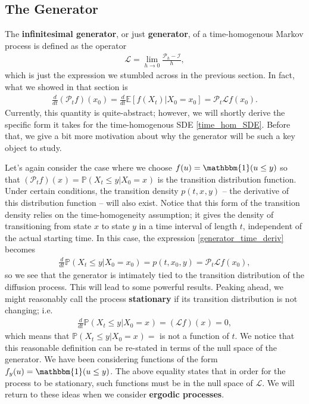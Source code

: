 \documentclass[12pt]{article}
\newcommand{\E}{\mathbb{E}}
\newcommand{\Prob}{\mathbb{P}}
\newcommand{\state}[1][t]{X_{#1}}
\newcommand{\stateValue}[1][t]{x_{#1}}
\newcommand{\op}[1][t]{\mathcal{P}_{#1}} %
\newcommand{\opId}{\mathcal{I}} %
\newcommand{\gen}{\mathcal{L}} %
\begin{document}
\subsection{The Generator}
The \textbf{infinitesimal generator}, or just \textbf{generator}, of a time-homogenous Markov process is defined as the operator
\begin{align}
\gen = \lim_{h \to 0} \frac{\op[h] - \opId}{h},
\end{align}
which is just the expression we stumbled across in the previous section. In fact, what we showed in that section is 
\begin{align}
\frac{d}{dt} (\op f)(\stateValue[0]) = \frac{d}{dt} \E[f(\state) | \state[0] = \stateValue[0]] = \op \gen f(\stateValue[0]). \label{generator_time_deriv}
\end{align}
Currently, this quantity is quite-abstract; however, we will shortly derive the specific form it takes for the time-homogenous SDE \ref{time_hom_SDE}. Before that, 
we give a bit more motivation about why the generator will be such a key object to study. 

Let's again consider the case where we choose $f(u) = \mathbbm{1}(u \leq y)$ so that $(\op f)(\stateValue[]) = \Prob(\state \leq y | \state[0] = \stateValue[])$ is the 
transition distribution function. Under certain conditions, the transition density $p(t, \stateValue[], y)$ -- the derivative of this distribution function -- will also exist. 
Notice that this form of the transition density relies on the time-homogeneity assumption; it gives the density of transitioning from state $x$ to state $y$ in a time 
interval of length $t$, independent of the actual starting time. In this case, the expression \ref{generator_time_deriv} becomes 
\begin{align*}
\frac{d}{dt} \Prob(\state \leq y | \state[0] = \stateValue[0]) = p(t, \stateValue[0], y) = \op \gen f(\stateValue[0]), 
\end{align*}
so we see that the generator is intimately tied to the transition distribution of the diffusion process. 
This will lead to some powerful results. Peaking ahead, we might 
reasonably call the process \textbf{stationary} if its transition distribution is not changing; i.e. 
\begin{align*}
\frac{d}{dt} \Prob(\state \leq y | \state[0] = \stateValue[]) = (\gen f)(\stateValue[]) = 0,
\end{align*} 
which means that $\Prob(\state \leq y | \state[0] = \stateValue[]) = $ is not a function of $t$. We notice that this reasonable definition can be 
re-stated in terms of the null space of the generator. We have been considering functions of the form $f_y(u) = \mathbbm{1}(u \leq y)$. The above 
equality states that in order for the process to be stationary, such functions must be in the null space of $\gen$. We will return to these ideas when we consider
\textbf{ergodic processes}. 
\end{document}
